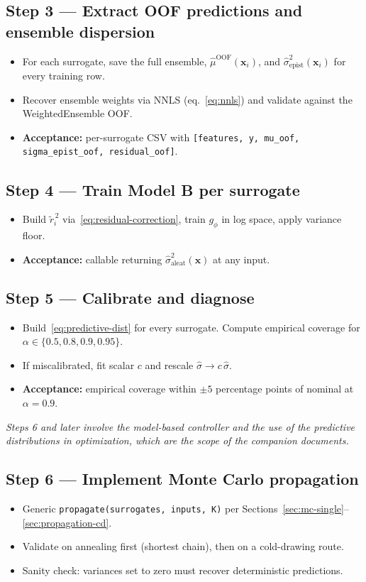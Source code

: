 \documentclass[11pt,a4paper]{article}
\begin{document}
\subsection*{Step 3 --- Extract OOF predictions and ensemble dispersion}
\begin{itemize}
    \item For each surrogate, save the full ensemble, $\hat\mu^{\text{OOF}}(\bm x_i)$, and $\hat\sigma^2_{\text{epist}}(\bm x_i)$ for every training row.
    \item Recover ensemble weights via NNLS (eq.~\eqref{eq:nnls}) and validate against the WeightedEnsemble OOF.
    \item \textbf{Acceptance:} per-surrogate CSV with \texttt{[features, y, mu\_oof, sigma\_epist\_oof, residual\_oof]}.
\end{itemize}

\subsection*{Step 4 --- Train Model B per surrogate}
\begin{itemize}
    \item Build $\tilde r_i^{\,2}$ via~\eqref{eq:residual-correction}, train $g_\phi$ in log space, apply variance floor.
    \item \textbf{Acceptance:} callable returning $\hat\sigma^2_{\text{aleat}}(\bm x)$ at any input.
\end{itemize}

\subsection*{Step 5 --- Calibrate and diagnose}
\begin{itemize}
    \item Build~\eqref{eq:predictive-dist} for every surrogate. Compute empirical coverage for $\alpha \in \{0.5, 0.8, 0.9, 0.95\}$.
    \item If miscalibrated, fit scalar $c$ and rescale $\hat\sigma \to c\,\hat\sigma$.
    \item \textbf{Acceptance:} empirical coverage within $\pm 5$ percentage points of nominal at $\alpha = 0.9$.
\end{itemize}

\textit{Steps 6 and later involve the model-based controller and the use of the predictive distributions in optimization, which are the scope of the companion documents.}

\subsection*{Step 6 --- Implement Monte Carlo propagation}
\begin{itemize}
    \item Generic \texttt{propagate(surrogates, inputs, K)} per Sections~\ref{sec:mc-single}--\ref{sec:propagation-cd}.
    \item Validate on annealing first (shortest chain), then on a cold-drawing route.
    \item Sanity check: variances set to zero must recover deterministic predictions.
\end{itemize}
\end{document}
